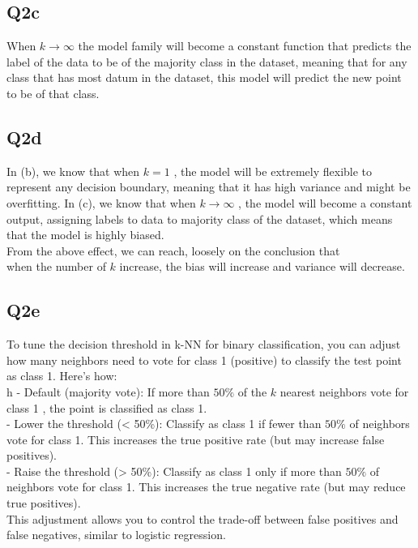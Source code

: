 \documentclass[12pt]{article}
\begin{document}
\newpage
\subsection{Q2c}
\begin{tcolorbox}[myblock, title = Answer]
  When $k\to \infty$ the model family will become a constant function that predicts the label of the data to be of the majority class in the dataset, meaning that for any class that has most datum in the dataset, this model will predict the new point to be of that class.
\end{tcolorbox}

\newpage
\subsection{Q2d }
\begin{tcolorbox}[myblock, title = Answer]
  In (b), we know that when $k = 1$ , the model will be extremely flexible to represent any decision boundary, meaning that it has high variance and might be overfitting. In (c), we know that when $k \to \infty$ , the model will become a constant output, assigning labels to data to majority class of the dataset, which means that the model is highly biased. \\
From the above effect, we can reach, loosely on the conclusion that \\
when the number of $k$ increase, the bias will increase and variance will decrease.
\end{tcolorbox}


\newpage
\subsection{Q2e }
\begin{tcolorbox}[myblock, title = Answer]
  To tune the decision threshold in k-NN for binary classification, you can adjust how many neighbors need to vote for class 1 (positive) to classify the test point as class 1. Here's how:\\h
- Default (majority vote): If more than \(50 \%\) of the \(k\) nearest neighbors vote for class 1 , the point is classified as class 1.\\
- Lower the threshold (< 50\%): Classify as class 1 if fewer than \(50 \%\) of neighbors vote for class 1. This increases the true positive rate (but may increase false positives).\\
- Raise the threshold (> 50\%): Classify as class 1 only if more than \(50 \%\) of neighbors vote for class 1. This increases the true negative rate (but may reduce true positives).\\

This adjustment allows you to control the trade-off between false positives and false negatives, similar to logistic regression.
\end{tcolorbox}
\end{document}
